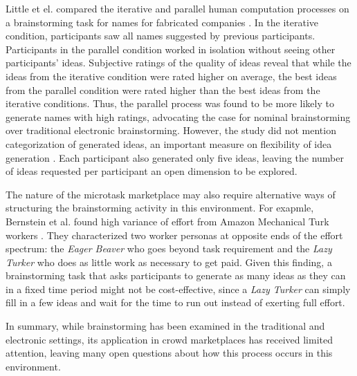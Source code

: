 Little et el. compared the iterative and parallel human computation processes on a brainstorming task for names for fabricated companies \cite{little2010exploring}. In the iterative condition, participants saw all names suggested by previous participants. Participants in the parallel condition worked in isolation without seeing other participants' ideas. Subjective ratings of the quality of ideas reveal that while the ideas from the iterative condition were rated higher on average, the best ideas from the parallel condition were rated higher than the best ideas from the iterative conditions. Thus, the parallel process was found to be more likely to generate names with high ratings, advocating the case for nominal brainstorming over traditional electronic brainstorming. However, the study did not mention categorization of generated ideas, an important measure on flexibility of idea generation \cite{lewis2011affective, nijstad_how_2006, finke1992creative, shah2003metrics}. Each participant also generated only five ideas, leaving the number of ideas requested per participant an open dimension to be explored.

The nature of the microtask marketplace may also require alternative ways of structuring the brainstorming activity in this environment.
For exapmle, Bernstein et al. found high variance of effort from Amazon Mechanical Turk workers \cite{soylent}. They characterized two worker personas at opposite ends of the effort spectrum: the {\em Eager Beaver\/} who goes beyond task requirement and the {\em Lazy Turker\/} who does as little work as necessary to get paid. Given this finding, a brainstorming task that asks participants to generate as many ideas as they can in a fixed time period might not be cost-effective, since a {\em Lazy Turker\/} can simply fill in a few ideas and wait for the time to run out instead of exerting full effort.




In summary, while brainstorming has been examined in the traditional and electronic settings, its application in crowd marketplaces has received limited attention, leaving many open questions about how this process occurs in this environment.
